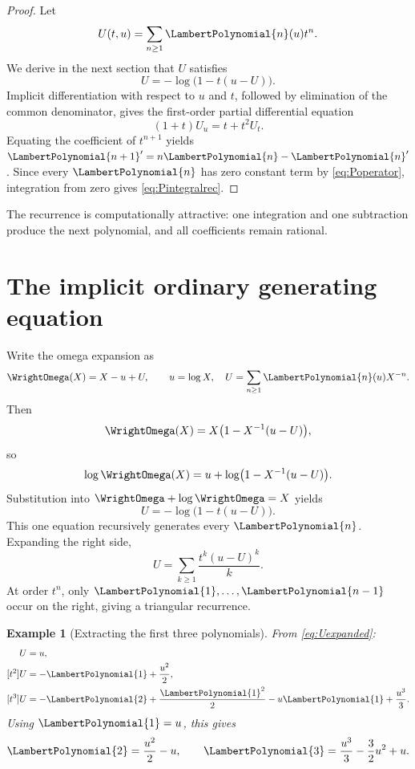 \documentclass[11pt,oneside,openany]{book}
\newtheorem{example}[theorem]{Example}
\begin{document}
\begin{proof}
Let
\begin{equation}\label{eq:Ugen}
 U(t,u)=\sum_{n\geq1}\LambertPolynomial{n}(u)t^n.
\end{equation}
We derive in the next section that \(U\) satisfies
\[
 U=-\log\bigl(1-t(u-U)\bigr).
\]
Implicit differentiation with respect to \(u\) and \(t\), followed by
elimination of the common denominator, gives the first-order partial
differential equation
\begin{equation}\label{eq:UPDE}
 (1+t)U_u=t+t^2U_t.
\end{equation}
Equating the coefficient of \(t^{n+1}\) yields
\(\LambertPolynomial{n+1}'=n\LambertPolynomial{n}-\LambertPolynomial{n}'\).  Since every \(\LambertPolynomial{n}\) has zero constant term by
\cref{eq:Poperator}, integration from zero gives \cref{eq:Pintegralrec}.
\end{proof}

The recurrence is computationally attractive: one integration and one
subtraction produce the next polynomial, and all coefficients remain rational.

\section{The implicit ordinary generating equation}
Write the omega expansion as
\begin{equation}\label{eq:omegaU}
 \WrightOmega(X)=X-u+U,
 \qquad u=\log X,
 \quad U=\sum_{n\geq1}\LambertPolynomial{n}(u)X^{-n}.
\end{equation}
Then
\[
 \WrightOmega(X)=X\bigl(1-X^{-1}(u-U)\bigr),
\]
so
\[
 \log\WrightOmega(X)
 =u+\log\bigl(1-X^{-1}(u-U)\bigr).
\]
Substitution into \(\WrightOmega+\log\WrightOmega=X\) yields
\begin{equation}\label{eq:Ufixed}
 \boxed{
 U=-\log\bigl(1-t(u-U)\bigr).
 }
\end{equation}
This one equation recursively generates every \(\LambertPolynomial{n}\).  Expanding the right
side,
\begin{equation}\label{eq:Uexpanded}
 U=\sum_{k\geq1}\frac{t^k(u-U)^k}{k}.
\end{equation}
At order \(t^n\), only \(\LambertPolynomial{1},\ldots,\LambertPolynomial{n-1}\) occur on the right, giving a
triangular recurrence.

\begin{example}[Extracting the first three polynomials]
From \cref{eq:Uexpanded}:
\begin{align*}
 [t]U&=u,\\
 [t^2]U&=-\LambertPolynomial{1}+\frac{u^2}{2},\\
 [t^3]U&=-\LambertPolynomial{2}+\frac{\LambertPolynomial{1}^2}{2}-u\LambertPolynomial{1}+\frac{u^3}{3}.
\end{align*}
Using \(\LambertPolynomial{1}=u\), this gives
\[
 \LambertPolynomial{2}=\frac{u^2}{2}-u,
 \qquad
 \LambertPolynomial{3}=\frac{u^3}{3}-\frac32u^2+u.
\]
\end{example}
\end{document}
